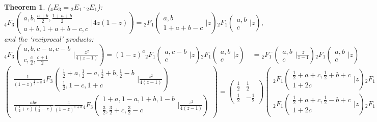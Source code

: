 \documentclass[12pt]{article}
\numberwithin{equation}{section}
\newtheorem{theorem}{Theorem}[section]
\newcommand{\Head}[3] {{}_{#1}{#2}_{#3}}
\newcommand{\ArgS}[3] {( \begin{smallmatrix} #1 \\ #2 \end{smallmatrix} | {#3})}
\newcommand{\FFs}[6] {{}_{#1}{#2}_{#3} ( \begin{smallmatrix} #4 \\ #5 \end{smallmatrix} | {#6}  )}
\newcommand{\FFes}[7] {{}_{#1}^{\,}{#2}_{#3}^{#4} ( \begin{smallmatrix} #5 \\ #6 \end{smallmatrix} | {#7} )}
\begin{document}
\begin{theorem}
\label{thm_4e3_2e1_2e1}
($\Head{4}{E}{3} = \Head{2}{E}{1} \cdot \Head{2}{E}{1}$):
\begin{equation*}
\Head{4}{F}{3} \ArgS{a, b, \frac{a + b}{2}, \frac{1 + a + b}{2}}{a + b, 1 + a + b - c, c}{4 z (1 - z)} = 
 \Head{2}{F}{1} \ArgS{a, b}{1 + a + b - c}{z} \Head{2}{F}{1} \ArgS{a, b}{c}{z}\text{,}
\end{equation*}
and the `reciprocal' products:
\begin{equation*}
\FFs{4}{F}{3}{a,b,c-a,c-b}{c, \frac{c}{2}, \frac{c+1}{2}}{\tfrac{z^2}{4(z-1)}} = (1-z)^a \FFs{2}{F}{1}{a,c-b}{c}{z} \FFs{2}{F}{1}{a,b}{c}{z} \quad =  \FFes{2}{F}{1}{-}{a,b}{c}{\tfrac{z}{z-1}} \FFs{2}{F}{1}{a,b}{c}{z}
\end{equation*}
\begin{equation*}
\left(\begin{array}{r}
\frac{1}{(1-z)^{\frac12+a}} \Head{4}{F}{3} \ArgS{\frac12+a,\frac12-a,\frac12+b,\frac12-b}{\frac{1}{2}, 1-c, 1+c}{\tfrac{z^2}{4(z-1)}}\\
\frac{a b c}{(\frac12+c)(\frac12-c)} \frac{z}{(1-z)^{1+a}} \Head{4}{F}{3} \ArgS{1+a,1-a,1+b,1-b}{\frac32, \frac32+c, \frac32-c}{\tfrac{z^2}{4(z-1)}}
\end{array}\right)
 =
\begin{pmatrix}
\tfrac12 & \tfrac12 \\
\tfrac12 & -\tfrac12
\end{pmatrix}
\begin{pmatrix}
\Head{2}{F}{1}\ArgS{\frac12+a+c,\frac12+b+c}{1+2c}{z} \Head{2}{F}{1}\ArgS{\frac12+a-c,\frac12-b-c}{1-2c}{z}
\\
\Head{2}{F}{1} \ArgS{\frac12+a+c,\frac12-b+c}{1+2c}{z}\Head{2}{F}{1} \ArgS{\frac12+a-c,\frac12+b-c}{1-2c}{z} \end{pmatrix}
\end{equation*}
\end{theorem}
\end{document}
